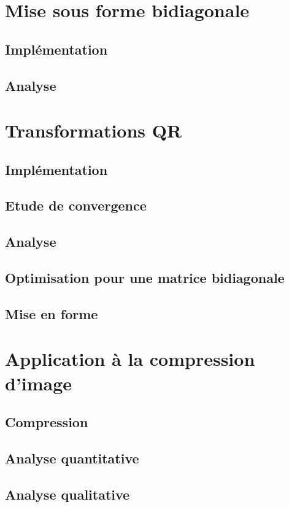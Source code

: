 \documentclass{article}
\begin{document}
\section{Mise sous forme bidiagonale}
\label{sec:forme_bidiag_}

\subsection{Implémentation}
\label{ssec:implem_bidiag_}

\subsection{Analyse}
\label{ssec:analyse_bidiag}


\section{Transformations QR}
\label{sec:transfo_qr}

\subsection{Implémentation}
\label{ssec:implem_qr}

\subsection{Etude de convergence}
\label{ssec:conv_qr}

\subsection{Analyse}
\label{ssec:analyse_qr}

\subsection{Optimisation pour une matrice bidiagonale}
\label{ssec:opti_bidiag_qr}

\subsection{Mise en forme}
\label{ssec:mise_en_forme_qr}


\section{Application à la compression d'image}
\label{sec:appli_compr_img}

\subsection{Compression}
\label{ssec:compr_img}

\subsection{Analyse quantitative}
\label{ssec:quanti_img}

\subsection{Analyse qualitative}
\label{ssec:quali_img}
\end{document}
